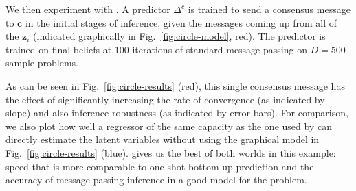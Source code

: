 We then experiment with \method. A predictor $\Delta^c$ is trained to send a consensus message to $\mathbf{c}$ in the initial stages of inference, given the messages coming up from all of the $\mathbf{z}_i$ (indicated graphically in Fig.~\ref{fig:circle-model}, red). The predictor is trained on final beliefs at 100 iterations of standard message passing on $D=500$ sample problems.

As can be seen in Fig.~\ref{fig:circle-results} (red), this single consensus message has the effect of significantly increasing the rate of convergence (as indicated by slope) and also inference robustness (as indicated by error bars). For comparison, we also plot how well a regressor of the same capacity as the one used by \MTD can directly estimate the latent variables without using the graphical model in Fig.~\ref{fig:circle-results} (blue). \Method gives us the best of both worlds in this example: speed that is more comparable to one-shot bottom-up prediction and the accuracy of message passing inference in a good model for the problem.

